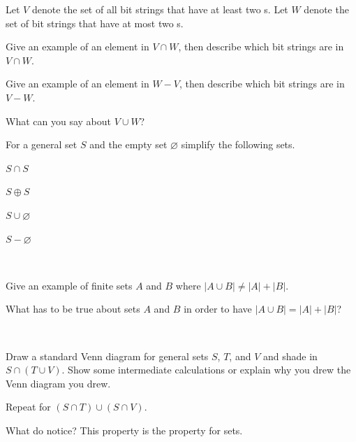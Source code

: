\begin{exer}[\exerU] %
\label{exer_bs_sets}
    Let $V$ denote the set of all bit strings that have at least two s.  Let $W$ denote the set of bit strings that have at most two s.
        \begin{exerpart}
            \item Give an example of an element in $V \cap W$, then describe which bit strings are in $V \cap W$.
            \item Give an example of an element in $W-V$, then describe which bit strings are in $V-W$.
            \item What can you say about $V \cup W$?
        \end{exerpart}
\end{exer}

\begin{exer}[\exerU] %
\label{exer_set_ops_with_phi}
    For a general set $S$ and the empty set $\varnothing$ simplify the following sets.
        \begin{apart}
            \item $S \cap S$
            \item $S \oplus S$
            \item $S \cup \varnothing$
            \item $S - \varnothing$
        \end{apart}    
\end{exer}

\begin{exer}[\exerU] %
\label{exer_card_union}
~
    \begin{exerpart}        
        \item Give an example of finite sets $A$ and $B$ where $|A \cup B| \neq |A|+ |B|$.
        \item What has to be true about sets $A$ and $B$ in order to have $|A \cup B| = |A|+ |B|$?
    \end{exerpart}
\end{exer}

\begin{exer}[\exerU] %
\label{exer_distributive_sets}   
~
    \begin{exerpart}
        \item Draw a standard Venn diagram for general sets $S$, $T$, and $V$ and shade in $ S \cap (T \cup V)$.  Show some intermediate calculations or explain why you drew the Venn diagram you drew.
        \item  Repeat for $(S \cap T) \cup (S \cap V)$.
        \item What do notice? This property is the  property for sets.
    \end{exerpart}
\end{exer}

